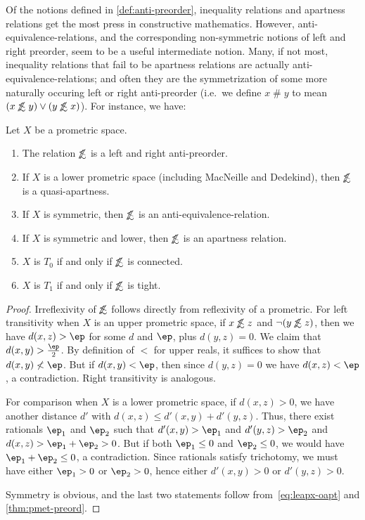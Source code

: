 \documentclass{article}
\def\apart{\mathrel{\#}}
\def\oapt{\mathrel{\!\not\,\not\lesssim}}
\def\hfep{\frac{\ep}{2}}
\begin{document}
Of the notions defined in \cref{def:anti-preorder}, inequality relations and apartness relations get the most press in constructive mathematics.
However, anti-equivalence-relations, and the corresponding non-symmetric notions of left and right preorder, seem to be a useful intermediate notion.
Many, if not most, inequality relations that fail to be apartness relations are actually anti-equivalence-relations; and often they are the symmetrization of some more naturally occuring left or right anti-preorder (i.e.\ we define $x\apart y$ to mean $(x\oapt y)\lor (y\oapt x)$).
For instance, we have:

\begin{thm}\label{thm:pmet-apreord}
  Let $X$ be a prometric space.
  \begin{enumerate}
  \item The relation $\oapt$ is a left and right anti-preorder.
  \item If $X$ is a lower prometric space (including MacNeille and Dedekind), then $\oapt$ is a quasi-apartness.
  \item If $X$ is symmetric, then $\oapt$ is an anti-equivalence-relation.
  \item If $X$ is symmetric and lower, then $\oapt$ is an apartness relation.
  \item $X$ is $T_0$ if and only if $\oapt$ is connected.
  \item $X$ is $T_1$ if and only if $\oapt$ is tight.
  \end{enumerate}
\end{thm}
\begin{proof}
  Irreflexivity of $\oapt$ follows directly from reflexivity of a prometric.
  For left transitivity when $X$ is an upper prometric space, if $x\oapt z$ and $\neg (y\oapt z)$, then we have $d(x,z)>\ep$ for some $d$ and $\ep$, plus $d(y,z)=0$.
  We claim that $d(x,y)>\hfep$.
  By definition of $<$ for upper reals, it suffices to show that $d(x,y) \not< \ep$.
  But if $d(x,y)<\ep$, then since $d(y,z)=0$ we have $d(x,z)<\ep$, a contradiction.
  Right transitivity is analogous.

  For comparison when $X$ is a lower prometric space, if $d(x,z)>0$, we have another distance $d'$ with $d(x,z) \le d'(x,y)+d'(y,z)$.
  Thus, there exist rationals $\ep_1$ and $\ep_2$ such that $d'(x,y)>\ep_1$ and $d'(y,z)>\ep_2$ and $d(x,z) > \ep_1+\ep_2 > 0$.
  But if both $\ep_1\le 0$ and $\ep_2\le 0$, we would have $\ep_1+\ep_2\le 0$, a contradiction.
  Since rationals satisfy trichotomy, we must have either $\ep_1>0$ or $\ep_2>0$, hence either $d'(x,y)>0$ or $d'(y,z)>0$.

  Symmetry is obvious, and the last two statements follow from~\eqref{eq:leapx-oapt} and \cref{thm:pmet-preord}.
\end{proof}
\end{document}

